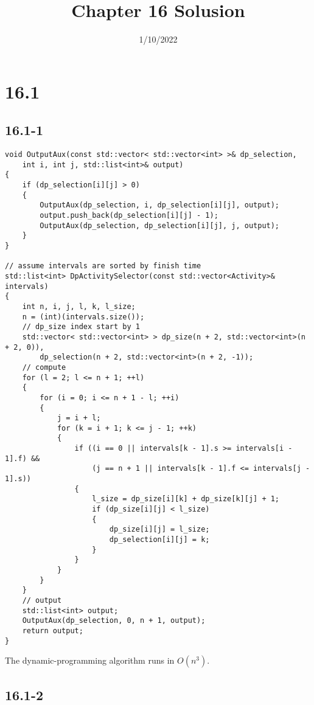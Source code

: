 

\title{Chapter 16 Solusion}
\date{1/10/2022}


\maketitle

\section*{16.1}

\subsection*{16.1-1}

\begin{verbatim}
void OutputAux(const std::vector< std::vector<int> >& dp_selection, 
    int i, int j, std::list<int>& output)
{
    if (dp_selection[i][j] > 0)
    {
        OutputAux(dp_selection, i, dp_selection[i][j], output);
        output.push_back(dp_selection[i][j] - 1);
        OutputAux(dp_selection, dp_selection[i][j], j, output);
    }
}

// assume intervals are sorted by finish time
std::list<int> DpActivitySelector(const std::vector<Activity>& intervals)
{
    int n, i, j, l, k, l_size;
    n = (int)(intervals.size());
    // dp_size index start by 1
    std::vector< std::vector<int> > dp_size(n + 2, std::vector<int>(n + 2, 0)), 
        dp_selection(n + 2, std::vector<int>(n + 2, -1));
    // compute
    for (l = 2; l <= n + 1; ++l)
    {
        for (i = 0; i <= n + 1 - l; ++i)
        {
            j = i + l;
            for (k = i + 1; k <= j - 1; ++k)
            {
                if ((i == 0 || intervals[k - 1].s >= intervals[i - 1].f) && 
                    (j == n + 1 || intervals[k - 1].f <= intervals[j - 1].s))
                {
                    l_size = dp_size[i][k] + dp_size[k][j] + 1;
                    if (dp_size[i][j] < l_size)
                    {
                        dp_size[i][j] = l_size;
                        dp_selection[i][j] = k;
                    }
                }
            }
        }
    }
    // output
    std::list<int> output;
    OutputAux(dp_selection, 0, n + 1, output);
    return output;
}
\end{verbatim}

The dynamic-programming algorithm runs in $O(n^3)$.

\subsection*{16.1-2}

